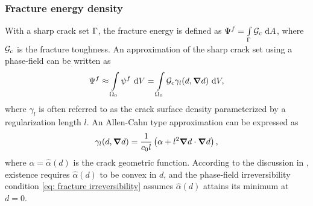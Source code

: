 \subsubsection{Fracture energy density}
\label{section: chapter3/theory/fracture}

With a sharp crack set $\Gamma$, the fracture energy is defined as $\Psi^f = \int\limits_\Gamma {\mathcal{G}_c} \text{ d}A$, where ${\mathcal{G}_c}$ is the fracture toughness. An approximation of the sharp crack set using a phase-field can be written as
\begin{align}
  \Psi^f \approx \int\limits_{\Omega_0} \psi^f \text{ d}V = \int\limits_{\Omega_0} {\mathcal{G}_c} \gamma_l(d, \boldsymbol{\nabla} d) \text{ d}V, \label{eq: fracture energy density}
\end{align}
where $\gamma_l$ is often referred to as the crack surface density parameterized by a regularization length $l$. An Allen-Cahn type approximation can be expressed as
\begin{align}
  \gamma_l(d, \boldsymbol{\nabla} d) = \dfrac{1}{c_0 l}\left( \alpha + l^2 \boldsymbol{\nabla} d \cdot \boldsymbol{\nabla} d \right), \label{eq: crack surface density}
\end{align}
where $\alpha = \hat{\alpha}(d)$ is the crack geometric function. According to the discussion in , existence requires $\hat{\alpha}(d)$ to be convex in $d$, and the phase-field irreversibility condition \eqref{eq: fracture irreversibility} assumes $\hat{\alpha}(d)$ attains its minimum at $d = 0$.

